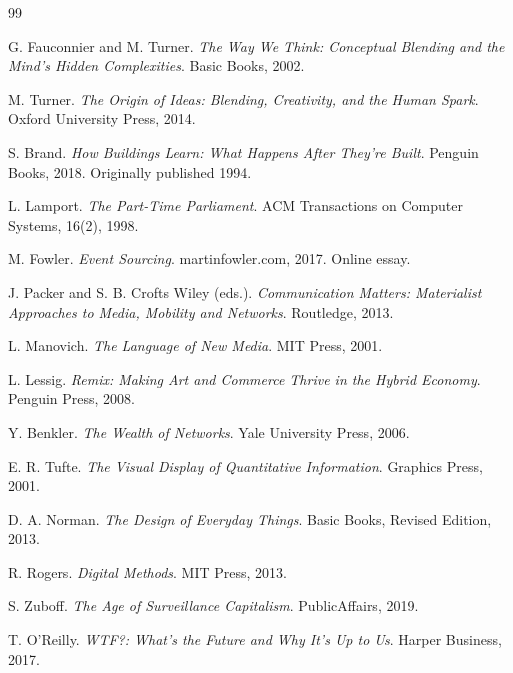 \documentclass[11pt,oneside]{article}
\begin{document}
\newpage
\begin{thebibliography}{99}

G. Fauconnier and M. Turner.
\newblock \emph{The Way We Think: Conceptual Blending and the Mind's Hidden Complexities}.
\newblock Basic Books, 2002.

M. Turner.
\newblock \emph{The Origin of Ideas: Blending, Creativity, and the Human Spark}.
\newblock Oxford University Press, 2014.

S. Brand.
\newblock \emph{How Buildings Learn: What Happens After They’re Built}.
\newblock Penguin Books, 2018.
\newblock Originally published 1994.

L. Lamport.
\newblock \emph{The Part-Time Parliament}.
\newblock ACM Transactions on Computer Systems, 16(2), 1998.

M. Fowler.
\newblock \emph{Event Sourcing}.
\newblock martinfowler.com, 2017.
\newblock Online essay.

J. Packer and S. B. Crofts Wiley (eds.).
\newblock \emph{Communication Matters: Materialist Approaches to Media, Mobility and Networks}.
\newblock Routledge, 2013.

L. Manovich.
\newblock \emph{The Language of New Media}.
\newblock MIT Press, 2001.

L. Lessig.
\newblock \emph{Remix: Making Art and Commerce Thrive in the Hybrid Economy}.
\newblock Penguin Press, 2008.

Y. Benkler.
\newblock \emph{The Wealth of Networks}.
\newblock Yale University Press, 2006.

E. R. Tufte.
\newblock \emph{The Visual Display of Quantitative Information}.
\newblock Graphics Press, 2001.

D. A. Norman.
\newblock \emph{The Design of Everyday Things}.
\newblock Basic Books, Revised Edition, 2013.

R. Rogers.
\newblock \emph{Digital Methods}.
\newblock MIT Press, 2013.

S. Zuboff.
\newblock \emph{The Age of Surveillance Capitalism}.
\newblock PublicAffairs, 2019.

T. O’Reilly.
\newblock \emph{WTF?: What’s the Future and Why It’s Up to Us}.
\newblock Harper Business, 2017.


\end{thebibliography}
\end{document}
